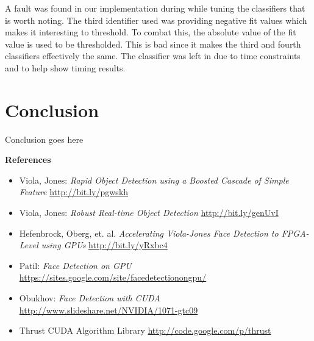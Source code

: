 \documentclass[12pt] {article}
\begin{document}
A fault was found in our implementation during while tuning the classifiers that is worth noting. The third identifier used was providing negative fit values which makes it interesting to threshold. To combat this, the absolute value of the fit value is used to be thresholded. This is bad since it makes the third and fourth classifiers effectively the same. The classifier was left in due to time constraints and to help show timing results. 




	
% 
% 
% 

\section{Conclusion}
Conclusion goes here

\clearpage
{\large \bf {References}}
\medskip

\normalsize
\begin{itemize}
	\item Viola, Jones: {\it Rapid Object Detection using a Boosted Cascade of Simple Feature}
	\newline \url {http://bit.ly/pgwskh}
	
	\item Viola, Jones: {\it Robust Real-time Object Detection}
	\newline \url {http://bit.ly/genUvI}
	
	\item Hefenbrock, Oberg, et. al. {\it Accelerating Viola-Jones Face Detection to FPGA-Level using GPUs}
	\newline \url {http://bit.ly/yRxbc4}
	
	\item Patil: {\it Face Detection on GPU}
	\newline \url {https://sites.google.com/site/facedetectionongpu/}
	
	\item Obukhov: {\it Face Detection with CUDA}
	\newline \url {http://www.slideshare.net/NVIDIA/1071-gtc09}
	
	\item Thrust CUDA Algorithm Library
	\newline \url {http://code.google.com/p/thrust}
	


\end{itemize}
\end{document}
